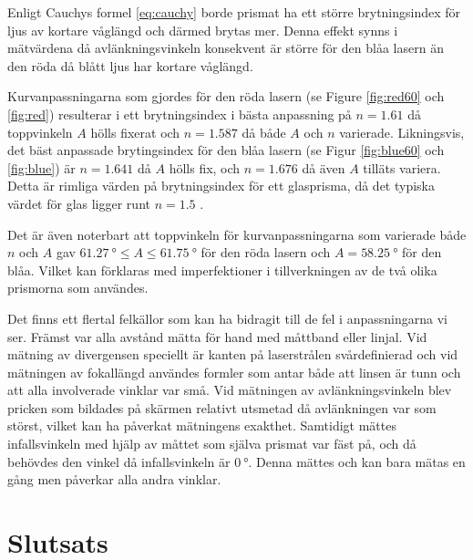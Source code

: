 \documentclass[a4paper]{article}
\begin{document}
  
  Enligt Cauchys formel \eqref{eq:cauchy} borde prismat ha ett större brytningsindex för ljus av kortare våglängd och därmed brytas mer. Denna effekt synns i mätvärdena då avlänkningsvinkeln konsekvent är större för den blåa lasern än den röda då blått ljus har kortare våglängd.
  
  
  

Kurvanpassningarna som gjordes för den röda lasern (se Figure \ref{fig:red60} och \ref{fig:red}) resulterar i ett brytningsindex i bästa anpassning på $n = 1.61$ då toppvinkeln $A$ hölls fixerat och $n = 1.587$ då både $A$ och $n$ varierade. Likningsvis, det bäst anpassade brytingsindex för den blåa lasern (se Figur \ref{fig:blue60} och \ref{fig:blue}) är $n = 1.641$ då $A$ hölls fix, och $n = 1.676$ då även $A$ tilläts variera. Detta är rimliga värden på brytningsindex för ett glasprisma, då det typiska värdet för glas ligger runt $n = 1.5$ \cite{glassProperties}.

Det är även noterbart att toppvinkeln för kurvanpassningarna som varierade både $n$ och $A$ gav $\SI{61.27}{\degree} \le A \le \SI{61.75}{\degree}$ för den röda lasern och $A = \SI{58.25}{\degree}$ för den blåa. Vilket kan förklaras med imperfektioner i tillverkningen av de två olika prismorna som användes.

  Det finns ett flertal felkällor som kan ha bidragit till de fel i anpassningarna vi ser. Främst var alla avstånd mätta för hand med måttband eller linjal. Vid mätning av divergensen speciellt är kanten på laserstrålen svårdefinierad och vid mätningen av fokallängd användes formler som antar både att linsen är tunn och att alla involverade vinklar var små. Vid mätningen av avlänkningsvinkeln blev pricken som bildades på skärmen relativt utsmetad då avlänkningen var som störst, vilket kan ha påverkat mätningens exakthet. Samtidigt mättes infallsvinkeln med hjälp av måttet som själva prismat var fäst på, och då behövdes den vinkel då infallsvinkeln är $\SI{0}{\degree}$. Denna mättes och kan bara mätas en gång men påverkar alla andra vinklar.
  

\section{Slutsats}
  
\end{document}
